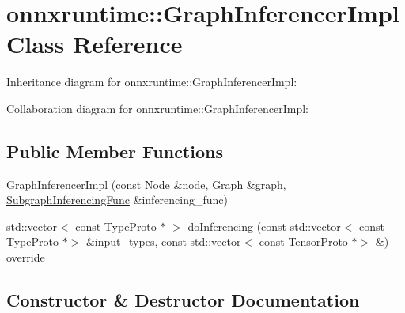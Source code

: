 \hypertarget{classonnxruntime_1_1GraphInferencerImpl}{}\section{onnxruntime\+:\+:Graph\+Inferencer\+Impl Class Reference}
\label{classonnxruntime_1_1GraphInferencerImpl}


Inheritance diagram for onnxruntime\+:\+:Graph\+Inferencer\+Impl\+:


Collaboration diagram for onnxruntime\+:\+:Graph\+Inferencer\+Impl\+:
\subsection*{Public Member Functions}
\begin{DoxyCompactItemize}
\item 
\mbox{\hyperlink{classonnxruntime_1_1GraphInferencerImpl_a3b7e63c541a8d800ebd32be3e88be952}{Graph\+Inferencer\+Impl}} (const \mbox{\hyperlink{classonnxruntime_1_1Node}{Node}} \&node, \mbox{\hyperlink{classonnxruntime_1_1Graph}{Graph}} \&graph, \mbox{\hyperlink{namespaceonnxruntime_ae184f68a858158d9595f3fe260b05dfb}{Subgraph\+Inferencing\+Func}} \&inferencing\+\_\+func)
\item 
std\+::vector$<$ const Type\+Proto $\ast$ $>$ \mbox{\hyperlink{classonnxruntime_1_1GraphInferencerImpl_adb5d5e5f020c9881069b645dffe9a719}{do\+Inferencing}} (const std\+::vector$<$ const Type\+Proto $\ast$$>$ \&input\+\_\+types, const std\+::vector$<$ const Tensor\+Proto $\ast$$>$ \&) override
\end{DoxyCompactItemize}


\subsection{Constructor \& Destructor Documentation}
\mbox{\label{classonnxruntime_1_1GraphInferencerImpl_a3b7e63c541a8d800ebd32be3e88be952}} 
